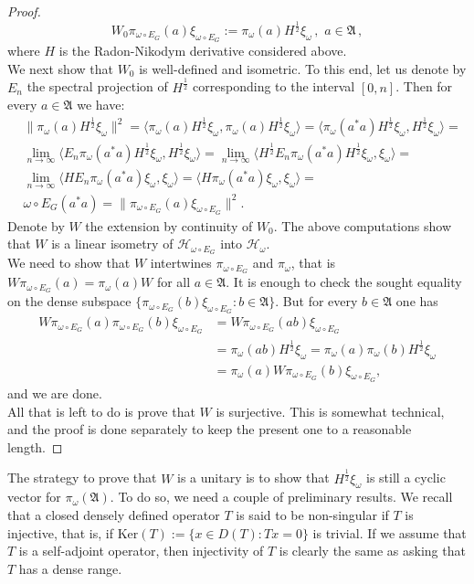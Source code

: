 \documentclass[12pt]{amsart}
\numberwithin{equation}{section}
\def\ch{{\mathcal H}}
\def\ga{{\mathfrak A}} \def\gpa{{\mathfrak a}}
\def\om{\omega} \def\Om{\Omega}
\theoremstyle{definition}
\begin{document}
\begin{proof}
$$W_0 \pi_{\om\circ E_G}(a)\xi_{\om\circ E_G}:=\pi_\om(a) H^\frac{1}{2}\xi_\om\,,\,\, a\in\ga\,,$$
where $H$ is the  Radon-Nikodym derivative considered above.\\
We next show that $W_0$ is well-defined and isometric. To this end, let us denote by 
$E_n$ the spectral projection of $H^\frac{1}{2}$ corresponding to the interval $[0, n]$. Then
for every $a\in \ga$ we have:
\begin{align*}
&\|\pi_\om(a) H^\frac{1}{2}\xi_\om\|^2= \langle \pi_\om(a) H^\frac{1}{2}\xi_\om, \pi_\om(a) H^\frac{1}{2}\xi_\om\rangle=
 \langle \pi_\om(a^*a) H^\frac{1}{2}\xi_\om, H^\frac{1}{2}\xi_\om\rangle=\\
&\lim_{n\rightarrow\infty} \langle E_n\pi_\om(a^*a) H^\frac{1}{2}\xi_\om, H^\frac{1}{2}\xi_\om\rangle
=\lim_{n\rightarrow\infty} \langle H^\frac{1}{2}E_n\pi_\om(a^*a) H^\frac{1}{2}\xi_\om, \xi_\om\rangle=\\
&\lim_{n\rightarrow\infty} \langle H E_n\pi_\om(a^*a) \xi_\om, \xi_\om\rangle= \langle H\pi_\om(a^*a) \xi_\om, \xi_\om\rangle= \\
&\om\circ E_G(a^*a)=\|\pi_{\om\circ E_G}(a)\xi_{\om\circ E_G}\|^2.
\end{align*}
Denote by $W$ the extension by continuity of $W_0$. The above computations show that $W$ is a linear isometry
of $\ch_{\om\circ E_G}$ into $\ch_\om$. \\
We need to show that $W$ intertwines $\pi_{\om\circ E_G}$  and
$\pi_\om$, that is $W\pi_{\om\circ E_G}(a)=\pi_\om(a) W$ for all $a\in\ga$. It is enough to check the sought equality on the dense subspace $\{\pi_{\om\circ E_G}(b)\xi_{\om\circ E_G}: b\in \ga\}$. But for every $b\in\ga$ one has
\begin{align*}
W\pi_{\om\circ E_G}(a)\pi_{\om\circ E_G}(b)\xi_{\om\circ E_G}&=W\pi_{\om\circ E_G}(ab)\xi_{\om\circ E_G}\\
&=\pi_\om(ab)H^\frac{1}{2}\xi_\om=
\pi_\om(a)\pi_\om(b)H^\frac{1}{2}\xi_\om\\
&=\pi_\om(a) W\pi_{\om\circ E_G}(b)\xi_{\om\circ E_G},
\end{align*}
and we are done. \\
All that is left to do is prove that $W$ is surjective. This is somewhat technical, and the proof is done separately to keep the present
one to a reasonable length.
\end{proof}

The strategy to prove that $W$ is a unitary is to show that $H^\frac{1}{2}\xi_\om$ is still a cyclic vector for $\pi_\om(\ga)$. To do so, we need a couple of preliminary results. 
We recall that a closed densely defined operator $T$ is
said to be non-singular if $T$ is injective, that is, if $\textrm{Ker}(T):=\{x\in D(T): Tx=0\}$ is trivial.  If we assume
that $T$ is a self-adjoint operator, then injectivity of $T$ is clearly the same as asking that $T$ has a dense range.\\
\end{document}
